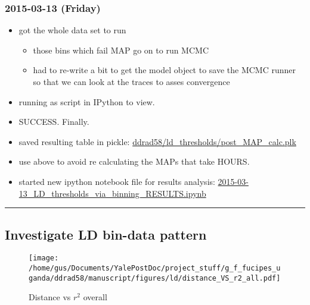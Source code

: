 \documentclass[letterpaper]{scrartcl}
\begin{document}
\subsubsection{2015-03-13 (Friday)}\label{friday}

\begin{itemize}
\itemsep1pt\parskip0pt
\item
  got the whole data set to run

  \begin{itemize}
  \itemsep1pt\parskip0pt
  \item
    those bins which fail MAP go on to run MCMC
  \item
    had to re-write a bit to get the model object to save the MCMC
    runner so that we can look at the traces to asses convergence
  \end{itemize}
\item
  running as script in IPython to view.
\item
  SUCCESS. Finally.
\item
  saved resulting table in pickle:
  \href{file:///home/gus/Documents/YalePostDoc/project_stuff/g_f_fucipes_uganda/ddrad58/ld_thresholds/post_MAP_calc.plk}{ddrad58/ld\_thresholds/post\_MAP\_calc.plk}
\item
  use above to avoid re calculating the MAPs that take HOURS.
\item
  started new ipython notebook file for results analysis:
  \href{file:///home/gus/Dropbox/repos/git/ipy_notebooks/YALE/ddrad58/2015-03-13_LD_thresholds_via_binning_RESULTS.ipynb}{2015-03-13\_LD\_thresholds\_via\_binning\_RESULTS.ipynb}
\end{itemize}

\begin{center}\rule{0.5\linewidth}{\linethickness}\end{center}

\newpage

\subsection{Investigate LD bin-data
pattern}\label{investigate-ld-bin-data-pattern}

\begin{figure}[htbp]
\centering
\texttt{[image: /home/gus/Documents/YalePostDoc/project\_stuff/g\_f\_fucipes\_uganda/ddrad58/manuscript/figures/ld/distance\_VS\_r2\_all.pdf]}
\caption{Distance vs \(r^2\) overall}
\end{figure}
\end{document}
